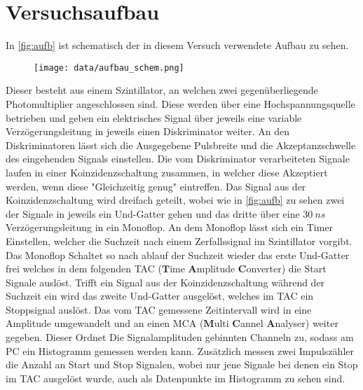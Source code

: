 \section{Versuchsaufbau}
In \autoref{fig:aufb} ist schematisch der in diesem Versuch verwendete Aufbau zu sehen.
\begin{figure}[H]
    \centering
    \texttt{[image: data/aufbau\_schem.png]}
    \label{fig:aufb}
\end{figure}
\noindent
Dieser besteht aus einem Szintillator, an welchen zwei gegenüberliegende Photomultiplier angeschlossen sind. Diese werden über eine Hochspannungsquelle betrieben und geben ein 
elektrisches Signal über jeweils eine variable Verzögerungsleitung in jeweils einen Diskriminator weiter. An den Diskriminatoren lässt sich die Ausgegebene Pulsbreite und die Akzeptanzschwelle des eingehenden Signals einstellen.
Die vom Diskriminator verarbeiteten Signale laufen in einer Koinzidenzschaltung zusammen, in welcher diese Akzeptiert werden, wenn diese "Gleichzeitig genug" eintreffen. Das Signal aus der Koinzidenzschaltung wird dreifach geteilt, wobei wie in \autoref{fig:aufb} zu sehen zwei der Signale in jeweils 
ein Und-Gatter gehen und das dritte über eine $\SI{30}{ns}$ Verzögerungsleitung in ein Monoflop. An dem Monoflop lässt sich ein Timer Einstellen, welcher die Suchzeit nach einem Zerfallssignal im Szintillator vorgibt. Das Monoflop Schaltet so nach ablauf der Suchzeit wieder das erste Und-Gatter frei welches in dem folgenden TAC ($\textbf{T}$ime $\textbf{A}$mplitude $\textbf{C}$onverter)
die Start Signale auslöst. Trifft ein Signal aus der Koinzidenzschaltung während der Suchzeit ein wird das zweite Und-Gatter ausgelöst, welches im TAC ein Stoppsignal auslöst. Das vom TAC gemessene Zeitintervall wird in eine Amplitude umgewandelt und an einen MCA ($\textbf{M}$ulti $\textbf{C}$annel $\textbf{A}$nalyser) weiter gegeben. Dieser Ordnet Die Signalamplituden gebinnten Channeln zu, sodass am PC ein Histogramm gemessen werden kann.
Zusätzlich messen zwei Impulszähler die Anzahl an Start und Stop Signalen, wobei nur jene Signale bei denen ein Stop im TAC ausgelöst wurde, auch als Datenpunkte im Histogramm zu sehen sind.
\newpage
